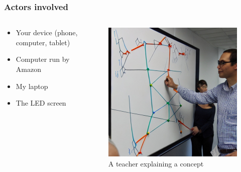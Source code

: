 \documentclass[
	11pt,
	t,
]{beamer}
\begin{document}
\begin{frame}
	\frametitle{Actors involved}
	\begin{columns}
	  \begin{column}{0.7\textwidth}
		\begin{itemize}
		  \item Your device (phone, computer, tablet) \\
		  \item Computer run by Amazon \\
		  \item My laptop \\
		  \item The LED screen \\
		\end{itemize}
	  \end{column}
	  \begin{column}{0.3\textwidth}
		\begin{center}
		  \begin{figure}
			\includegraphics[scale=0.17]{2.jpg}
			\caption{A teacher explaining a concept}
		  \end{figure}
		\end{center}
	  \end{column}
	\end{columns}
\end{frame}
\end{document}
